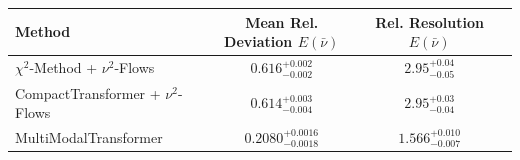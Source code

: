     \begin{tabular}{lccc}
        \toprule
        Method & Mean Rel. Deviation $E(\bar{\nu})$ & Rel. Resolution $E(\bar{\nu})$ \\
        \midrule
        $\chi^2$-Method + $\nu^2$-Flows & $0.616^{+0.002}_{-0.002}$ & $2.95^{+0.04}_{-0.05}$ \\
        CompactTransformer + $\nu^2$-Flows & $0.614^{+0.003}_{-0.004}$ & $2.95^{+0.03}_{-0.04}$ \\
        MultiModalTransformer & $0.2080^{+0.0016}_{-0.0018}$ & $1.566^{+0.010}_{-0.007}$ \\
        \bottomrule
    \end{tabular}